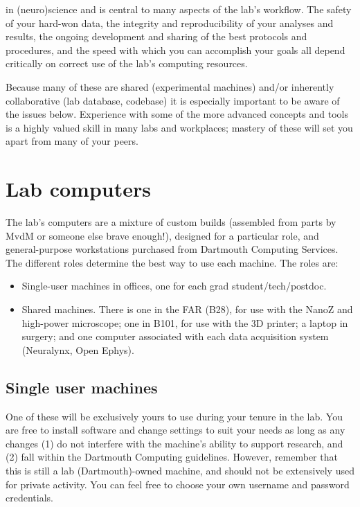 \documentclass{tufte-book}
\begin{document}
 in
(neuro)science and is central to many aspects of the lab's
workflow. The safety of your hard-won data, the integrity and
reproducibility of your analyses and results, the ongoing development
and sharing of the best protocols and procedures, and the speed with
which you can accomplish your goals all depend critically on correct
use of the lab's computing resources.

Because many of these are shared (experimental machines) and/or
inherently collaborative (lab database, codebase) it is especially
important to be aware of the issues below. Experience with some of the
more advanced concepts and tools is a highly valued skill in many labs
and workplaces; mastery of these will set you apart from many of your
peers.

\section{Lab computers}

The lab's computers are a mixture of custom builds (assembled from
parts by MvdM or someone else brave enough!), designed for a
particular role, and general-purpose workstations purchased from
Dartmouth Computing Services. The different roles determine the best
way to use each machine. The roles are:

\begin{itemize}
\item{Single-user machines in offices, one for each grad
student/tech/postdoc.}
\item{Shared machines. There is one in the FAR (B28), for use with the
  NanoZ and high-power microscope; one in B101, for use with the 3D
  printer; a laptop in surgery; and one computer associated with each
  data acquisition system (Neuralynx, Open Ephys).}
\end{itemize}

\subsection{Single user machines}

One of these will be exclusively yours to use during your tenure in
the lab. You are free to install software and change settings to suit
your needs as long as any changes (1) do not interfere with the
machine's ability to support research, and (2) fall within the
Dartmouth Computing guidelines. However, remember that
this is still a lab (Dartmouth)-owned machine, and should not be
extensively used for private activity. You can feel free to choose
your own username and password credentials.
\end{document}

